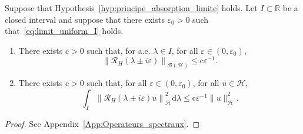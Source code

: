 \documentclass[AHL,Unicode,longabstracts,published]{cedram}
\newcommand{\Hi}{\mathcal{H}}
\newcommand{\R}{\mathbb{R}}
\newcommand{\rmc}{\mathrm{c}}
\newcommand{\rmd}{\mathrm{d}}
\newcommand{\Res}{\mathcal{R}}
\newcommand{\clB}{\mathcal{B}}
\newcommand*{\romanenumi}{\renewcommand*{\theenumi}{\roman{enumi}}}
\newcommand{\Hi}{\mathcal{H}}
\newcommand{\R}{\mathbb{R}}
\begin{document}
\begin{lemm}\label{lm:res_bound}
Suppose that Hypothesis~\ref{hyp:principe_absorption_limite} holds. Let $I\subset\R$ be a closed interval and suppose that there exists $\varepsilon_0>0$ such that~\eqref{eq:limit_uniform_I} holds.
\begin{enumerate}\romanenumi
\item\label{it:res_bound1}
There exists $\rmc>0$ such that, for a.e. $\lambda\in I$, for all $\varepsilon\in(0,\varepsilon_0)$,
\begin{equation*}
\left\|\Res_H(\lambda\pm i\varepsilon)\right\|_{\clB(\Hi)}\le\rmc\varepsilon^{-1}.
\end{equation*}
\item\label{it:res_bound2}
There exists $\rmc>0$ such that, for all $\varepsilon\in(0,\varepsilon_0)$, for all $u\in\Hi$,
\begin{equation*}
\int_I \left\|\Res_H(\lambda\pm i\varepsilon) u\right\|_\Hi^2\rmd \lambda \le \rmc\varepsilon^{-1} \|u\|^2_\Hi.
\end{equation*}
\end{enumerate}
\end{lemm}

\begin{proof}
See Appendix~\ref{App:Operateurs_spectraux}.
\end{proof}
\end{document}
